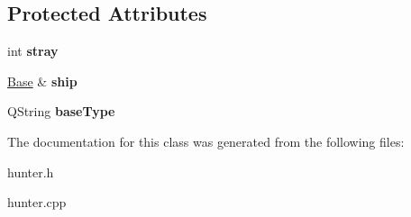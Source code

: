 \subsection*{Protected Attributes}
\begin{DoxyCompactItemize}
\item 
\mbox{\label{classgame_1_1Hunter_ab3891c72a1f10574fa959eac73e776d1}} 
int {\bfseries stray}
\item 
\mbox{\label{classgame_1_1Hunter_a4ede49f4343fa2023af16eb70b320f8f}} 
\hyperlink{classgame_1_1Base}{Base} \& {\bfseries ship}
\item 
\mbox{\label{classgame_1_1Hunter_a73f0f5f7a2817ae1078613a4a045fe91}} 
Q\+String {\bfseries base\+Type}
\end{DoxyCompactItemize}


The documentation for this class was generated from the following files\+:\begin{DoxyCompactItemize}
\item 
hunter.\+h\item 
hunter.\+cpp\end{DoxyCompactItemize}
